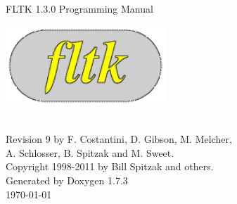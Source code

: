 \documentclass[a4paper]{book}
\begin{document}
\begin{titlepage}
\vspace*{4.5cm}
\begin{center}
{\Huge FLTK 1.3.0 Programming Manual}\\
\vspace*{2cm}
\begin{ImageNoCaption}
 \mbox{\includegraphics[width=6cm]{FL200}}
\end{ImageNoCaption}\\
\vspace*{2cm}
{\Large
Revision 9 by F. Costantini, D. Gibson, M. Melcher, \\
A. Schlosser, B. Spitzak and M. Sweet.}\\
\vspace*{1.5cm}
{\large Copyright 1998-2011 by Bill Spitzak and others.}\\
\vspace*{3.5cm}
{\large Generated by Doxygen 1.7.3}\\
\vspace*{0.5cm}
\today{}\\
\end{center}
\end{titlepage}
\clearemptydoublepage
{}
\tableofcontents
\clearemptydoublepage
{}
\end{document}

